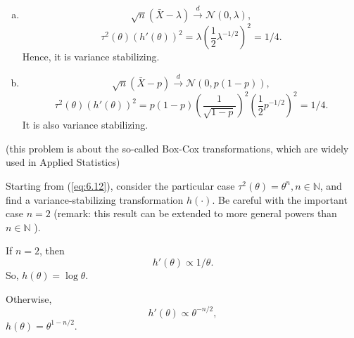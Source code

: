 \begin{solution}
    \begin{enumerate}[(a)]
        \item \[
            \sqrt{n}(\bar{X}-\lambda)\stackrel{d}{\to} \mathcal{N}(0, \lambda), 
        \]
        \[
            \tau^2(\theta)(h'(\theta))^2=\lambda\left(\frac{1}{2}\lambda^{-1/2}\right)^2=1/4. 
        \]
        Hence, it is variance stabilizing. 
        \item \[
            \sqrt{n}(\bar{X}-p)\stackrel{d}{\to} \mathcal{N}(0, p(1-p)),
        \]
        \[
            \tau^2(\theta)(h'(\theta))^2=p(1-p)\left(\frac{1}{\sqrt{1-p}}\right)^2\left(\frac{1}{2}p^{-1/2}\right)^2=1/4. 
        \]
        It is also variance stabilizing. 
    \end{enumerate}
\end{solution}


\begin{ex}
    (this problem is about the so-called Box-Cox transformations, which are widely used in Applied Statistics) 
    
    Starting from (\ref{eq:6.12}), consider the particular case \(\tau^{2}(\theta)=\theta^{n}, n \in \mathbb{N}\), and find a variance-stabilizing transformation \(h(\cdot)\). Be careful with the important case \(n=2\) (remark: this result can be extended to more general powers than \(n \in \mathbb{N}\) ).
\end{ex}

\begin{solution}
    If $n=2$, then
    \[
        h'(\theta)\propto 1/\theta. 
    \]
    So, $h(\theta)=\log \theta$. 

    Otherwise, 
    \[
        h'(\theta)\propto \theta^{-n/2}, 
    \]
    $h(\theta)=\theta^{1-n/2}$. 
\end{solution}



